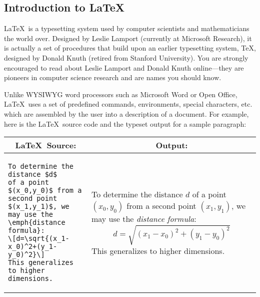 
\usepackage[compact]{titlesec}




\subsection*{Introduction to \LaTeX}
\LaTeX\ is a typesetting system used by computer scientists and mathematicians
the world over. Designed by Leslie Lamport (currently at Microsoft Research),
it is actually a set of procedures that build upon an earlier typesetting
system, \TeX, designed by Donald Knuth (retired from Stanford University).
You are strongly encouraged to read about Leslie Lamport and Donald Knuth 
online---they are pioneers in computer science research and are 
names you should know.

Unlike WYSIWYG word processors such as Microsoft Word or Open Office, \LaTeX\ 
uses a set of predefined commands, environments, special characters, etc.
which are assembled by the user into a description of a document. For
example, here is the \LaTeX\ source code and the typeset output
for a sample paragraph:
\begin{center}
\begin{tabular}{p{3in}p{3in}}
\multicolumn{1}{c}{\bf \LaTeX\ Source:}&
\multicolumn{1}{c}{\bf Output:}\\\hline
\begin{minipage}{3in}
\small
\begin{verbatim}
To determine the distance $d$ 
of a point $(x_0,y_0)$ from a 
second point $(x_1,y_1)$, we 
may use the \emph{distance
formula}:
\[d=\sqrt{(x_1-x_0)^2+(y_1-y_0)^2}\]
This generalizes to higher dimensions.
\end{verbatim}
\end{minipage}
&
\begin{minipage}{3in}
To determine the distance $d$ 
of a point $(x_0,y_0)$ from a 
second point $(x_1,y_1)$, we 
may use the \emph{distance
formula}:
\[d=\sqrt{(x_1-x_0)^2+(y_1-y_0)^2}\]
This generalizes to higher dimensions.
\end{minipage}
\end{tabular}
\end{center}

